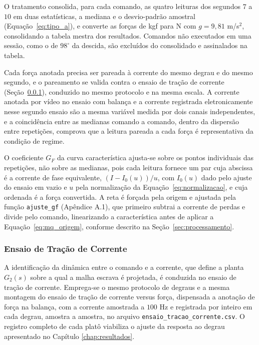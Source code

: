 O tratamento consolida, para cada comando, as quatro leituras dos segundos $7$ a $10$ em
duas estatísticas, a mediana e o desvio-padrão amostral
(Equação~\eqref{eq:tipo_a}), e converte as forças de kgf para N com $g = 9{,}81$
m/s$^2$, consolidando a tabela mestra dos resultados. Comandos não executados em uma
sessão, como o de $98^\circ$ da descida, são excluídos do consolidado e assinalados na
tabela.

Cada força anotada precisa ser pareada à corrente do mesmo degrau e do mesmo segundo, e o
pareamento se valida contra o ensaio de tração de corrente
(Seção~\ref{sec:tracaocorrente}), conduzido no mesmo protocolo e na mesma escala. A
corrente anotada por vídeo no ensaio com balança e a corrente registrada eletronicamente
nesse segundo ensaio são a mesma variável medida por dois canais independentes, e a
coincidência entre as medianas comando a comando, dentro da dispersão entre repetições,
comprova que a leitura pareada a cada força é representativa da condição de regime.

O coeficiente $G_F$ da curva característica ajusta-se sobre os pontos individuais das
repetições, não sobre as medianas, pois cada leitura fornece um par cuja abscissa é a
corrente de fase equivalente, $(I - I_0(u))/u$, com $I_0(u)$ dado pelo ajuste do ensaio em
vazio e $u$ pela normalização da Equação~\eqref{eq:normalizacao}, e cuja ordenada é a
força convertida. A reta é forçada pela origem e ajustada pela função
\texttt{ajuste\_gf} (Apêndice A.1), que primeiro subtrai a corrente de perdas e divide
pelo comando, linearizando a característica antes de aplicar a
Equação~\eqref{eq:mq_origem}, conforme descrito na Seção~\ref{sec:processamento}.

\subsubsection{Ensaio de Tração de Corrente}
\label{sec:tracaocorrente}

A identificação da dinâmica entre o comando e a corrente, que define a planta $G_2(s)$ sobre
a qual a malha escrava é projetada, é conduzida no ensaio de tração de corrente. Emprega-se
o mesmo protocolo de degraus e a mesma montagem do ensaio de tração de corrente versus
força, dispensada a anotação de força na balança, com a
corrente amostrada a $100$ Hz e registrada por inteiro em cada degrau, amostra a amostra,
no arquivo \texttt{ensaio\_tracao\_corrente.csv}. O registro completo de cada platô
viabiliza o ajuste da resposta ao degrau apresentado no Capítulo \ref{chap:resultados}.

